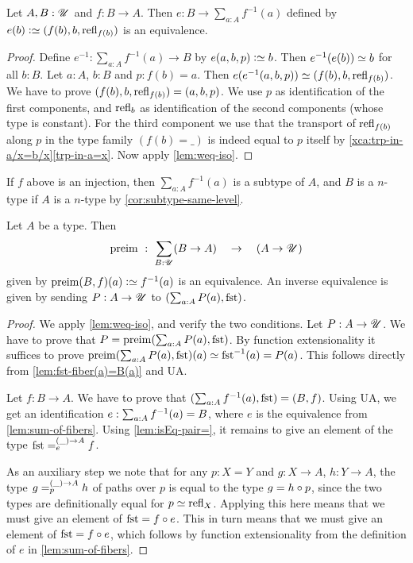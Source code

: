 \begin{lemma}\label{lem:sum-of-fibers}
Let $A,B:{\mathscr{U}}$ and $f:B\to A$. 
Then $e: B \to \sum_{a:A} f^{-1}(a)$ defined by
$e(b)\defeq (f(b),b,\refl{f(b)})$ is an equivalence.
\end{lemma}
\begin{proof}
Define $e^{-1}: \sum_{a:A} f^{-1}(a) \to B$ by $e(a,b,p)\defeq b$.
Then $e^{-1}(e(b))\jdeq b$ for all $b:B$.
Let $a:A$, $b:B$ and $p: f(b)=a$.
Then $e(e^{-1}(a,b,p))\jdeq (f(b),b,\refl{f(b)})$.
We have to prove $(f(b),b,\mathrm{refl}_{f(b)})=(a,b,p)$.
We use $p$ as identification of the first components,
and $\mathrm{refl}_{b}$ as identification of the second components
(whose type is constant). For the third component
we use that the transport of $\mathrm{refl}_{f(b)}$ along $p$
in the type family $(f(b)=\_)$ is indeed equal to $p$
itself by \cref{xca:trp-in-a/x=b/x}\ref{trp-in-a=x}.
Now apply \cref{lem:weq-iso}.
\end{proof}

If $f$ above is an injection, then $\sum_{a:A} f^{-1}(a)$ is a subtype of $A$,
and $B$ is a $n$-type if $A$ is a $n$-type by \cref{cor:subtype-same-level}.

\begin{lemma}\label{lem:typefamiliesandfibrations}
Let $A$ be a type. Then
\[
\preim ~:~ \sum_{B:\UU}(B\to A) \quad\to\quad (A\to\UU) 
\] 
given by $\preim(B,f)(a)\defeq f^{-1}(a)$ is an equivalence.
An inverse equivalence is given by sending $P:A\to{\mathscr{U}}$ to 
$(\sum_{a:A}P(a), \fst)$.
\end{lemma}

\begin{proof}
We apply \cref{lem:weq-iso}, and verify the two conditions.
Let $P:A\to{\mathscr{U}}$. We have to prove that $P = \preim(\sum_{a:A}P(a), \fst)$.
By function extensionality it suffices to prove
$\preim(\sum_{a:A}P(a), \fst)(a)\jdeq \fst^{-1}(a) = P(a)$.
This follows directly from \cref{lem:fst-fiber(a)=B(a)} and UA.

Let $f: B\to A$. We have to prove that $(\sum_{a:A} f^{-1}(a), \fst)=(B,f)$.
Using UA, we get an identification
${e} : \sum_{a:A} f^{-1}(a) = B$, where $e$ is the equivalence
from \cref{lem:sum-of-fibers}. Using \cref{lem:isEq-pair=},
it remains to give an element of the type $\pathover{\fst}{(\_)\to A}{\etop{e}}{f}$.

As an auxiliary step we note that for any $p: X=Y$ and $g:X\to A$,
$h:Y\to A$, the type $\pathover{g}{(\_)\to A}{p}{h}$ of paths over $p$
is equal to the type $g = h\circ{{p}}$, since the two
types are definitionally equal for $p\jdeq\refl{X}$.
Applying this here means that we must give an element of
$\fst = f\circ{\ptoe{\etop{e}}}$. This in turn means that
we must give an element of $\fst = f\circ e$,
which follows by function extensionality from the definition 
of $e$ in \cref{lem:sum-of-fibers}.
\end{proof}

